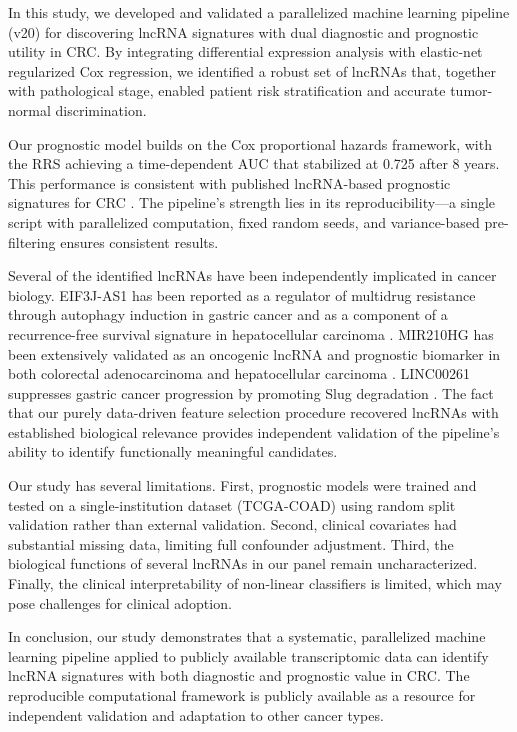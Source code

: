 \documentclass[11pt,a4paper]{article}
\begin{document}
In this study, we developed and validated a parallelized machine learning pipeline (v20) for discovering lncRNA signatures with dual diagnostic and prognostic utility in CRC. By integrating differential expression analysis with elastic-net regularized Cox regression, we identified a robust set of lncRNAs that, together with pathological stage, enabled patient risk stratification and accurate tumor-normal discrimination.

Our prognostic model builds on the Cox proportional hazards framework, with the RRS achieving a time-dependent AUC that stabilized at 0.725 after 8 years. This performance is consistent with published lncRNA-based prognostic signatures for CRC \citep{RN17}. The pipeline's strength lies in its reproducibility---a single script with parallelized computation, fixed random seeds, and variance-based pre-filtering ensures consistent results.

Several of the identified lncRNAs have been independently implicated in cancer biology. EIF3J-AS1 has been reported as a regulator of multidrug resistance through autophagy induction in gastric cancer and as a component of a recurrence-free survival signature in hepatocellular carcinoma \citep{RN20,RN21}. MIR210HG has been extensively validated as an oncogenic lncRNA and prognostic biomarker in both colorectal adenocarcinoma and hepatocellular carcinoma \citep{RN22,RN23}. LINC00261 suppresses gastric cancer progression by promoting Slug degradation \citep{RN24}. The fact that our purely data-driven feature selection procedure recovered lncRNAs with established biological relevance provides independent validation of the pipeline's ability to identify functionally meaningful candidates.

Our study has several limitations. First, prognostic models were trained and tested on a single-institution dataset (TCGA-COAD) using random split validation rather than external validation. Second, clinical covariates had substantial missing data, limiting full confounder adjustment. Third, the biological functions of several lncRNAs in our panel remain uncharacterized. Finally, the clinical interpretability of non-linear classifiers is limited, which may pose challenges for clinical adoption.

In conclusion, our study demonstrates that a systematic, parallelized machine learning pipeline applied to publicly available transcriptomic data can identify lncRNA signatures with both diagnostic and prognostic value in CRC. The reproducible computational framework is publicly available as a resource for independent validation and adaptation to other cancer types.
\end{document}
